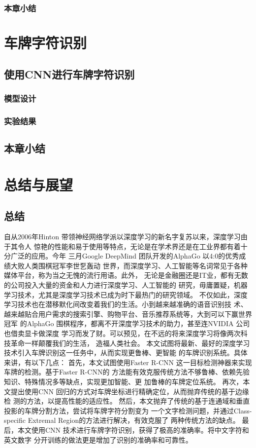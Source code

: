 \subsection{本章小结}

\chapter{车牌字符识别}

\section{使用CNN进行车牌字符识别}

\subsection{模型设计}

\subsection{实验结果}

\section{本章小结}

\chapter{总结与展望}

\section{总结}

自从2006年Hinton 带领神经网络学派以深度学习的新名字复苏以来，深度学习由于其令人
惊艳的性能和易于使用等特点，无论是在学术界还是在工业界都有着十分广泛的应用。今年
三月Google DeepMind 团队开发的AlphaGo 以4:0的优秀成绩大败人类围棋冠军李世乭轰动
世界，而深度学习、人工智能等名词常见于各种媒体平台，称为当之无愧的流行用语。此外，
无论是金融圈还是IT业，都有无数的公司投入大量的资金和人力进行深度学习、人工智能的
研究，毋庸置疑，机器学习技术，尤其是深度学习技术已成为时下最热门的研究领域。
不仅如此，深度学习技术也在潜移默化间改变着我们的生活。小到越来越准确的语音识别技
术、越来越贴合用户需求的搜索引擎、购物平台、音乐推荐系统等，大到可以下赢世界冠军
的AlphaGo 围棋程序，都离不开深度学习技术的助力，甚至连NVIDIA 公司也借卖显卡做深度
学习而发了财。可以预见，在不远的将来深度学习将像两次科技革命一样颠覆我们的生活，
造福人类社会。
本文试图将最新、最好的深度学习技术引入车牌识别这一任务中，从而实现更鲁棒、更智能
的车牌识别系统。具体来讲，有以下几点：
首先，本文试图使用Faster R-CNN 这一目标检测神器来实现车牌的检测。基于Faster R-CNN的
方法能有效克服传统方法不够鲁棒、依赖先验知识、特殊情况多等缺点，实现更加智能、更
加鲁棒的车牌定位系统。
再次，本文提出使用CNN 回归的方式对车牌坐标进行精确定位，从而抛弃传统的基于边缘检
测的方法，以提高性能的适应性。
然后，本文抛弃了传统的基于连通域和垂直投影的车牌分割方法，尝试将车牌字符分割变为
一个文字检测问题，并通过Class-specific Extremal Region的方法进行解决，有效克服了
两种传统方法的缺点。
最后，本文使用CNN 技术进行车牌字符识别，获得了极高的准确率。将中文字符和英文数字
分开训练的做法更是增加了识别的准确率和可靠性。

